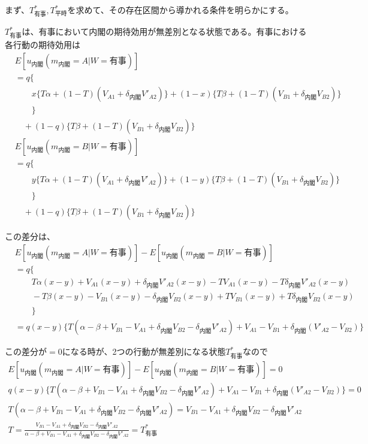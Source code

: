 \documentclass[main.tex]{subfiles}
\begin{document}
まず、$T^*_{有事}, T^*_{平時}$を求めて、その存在区間から導かれる条件を明らかにする。

$T^*_{有事}$は、有事において内閣の期待効用が無差別となる状態である。有事における各行動の期待効用は
\begin{align*}
    & E[u_{内閣}(m_{内閣}=A|W=有事)]\\
    & = q\lbrace \\
    & \quad\quad x \lbrace T\alpha + (1-T)(V_{A1} + \delta_{内閣} V'_{A2}) \rbrace + (1-x)\lbrace T\beta + (1-T)(V_{B1} + \delta_{内閣} V_{B2}) \rbrace \\
    & \quad\quad \rbrace\\
    & \quad +(1-q)\lbrace T\beta + (1-T)(V_{B1} + \delta_{内閣} V_{B2}) \rbrace
\end{align*}
\begin{align*}
    & E[u_{内閣}(m_{内閣}=B|W=有事)]\\
    & = q\lbrace \\
    & \quad\quad y \lbrace T\alpha + (1-T)(V_{A1} + \delta_{内閣} V'_{A2}) \rbrace + (1-y)\lbrace T\beta + (1-T)(V_{B1} + \delta_{内閣} V_{B2}) \rbrace \\
    & \quad\quad \rbrace\\
    & \quad +(1-q)\lbrace T\beta + (1-T)(V_{B1} + \delta_{内閣} V_{B2}) \rbrace
\end{align*}

この差分は、
\begin{align*}
    & E[u_{内閣}(m_{内閣}=A|W=有事)] - E[u_{内閣}(m_{内閣}=B|W=有事)]\\
    & = q\lbrace \\
    & \quad\quad T\alpha(x-y) + V_{A1}(x-y) + \delta_{内閣}V'_{A2}(x-y) - TV_{A1}(x-y) - T\delta_{内閣}V'_{A2}(x-y) \\
    & \quad\quad -T\beta(x-y) - V_{B1}(x-y) - \delta_{内閣}V_{B2}(x-y) + TV_{B1}(x-y) + T\delta_{内閣}V_{B2}(x-y)\\
    & \quad\quad  \rbrace\\
    & = q(x-y) \lbrace T(\alpha-\beta + V_{B1}-V_{A1} + \delta_{内閣}V_{B2} - \delta_{内閣}V'_{A2}) 
                +V_{A1} - V_{B1} + \delta_{内閣}(V'_{A2} - V_{B2}) \rbrace
\end{align*}

この差分が$=0$になる時が、2つの行動が無差別になる状態$T^*_{有事}$なので
\begin{gather*}
    E[u_{内閣}(m_{内閣}=A|W=有事)] - E[u_{内閣}(m_{内閣}=B|W=有事)] = 0　\\
    q(x-y) \lbrace T(\alpha-\beta + V_{B1}-V_{A1} + \delta_{内閣}V_{B2} - \delta_{内閣}V'_{A2}) 
                +V_{A1} - V_{B1} + \delta_{内閣}(V'_{A2} - V_{B2})  \rbrace = 0 \\
    T(\alpha-\beta + V_{B1}-V_{A1} + \delta_{内閣}V_{B2} - \delta_{内閣}V'_{A2}) 
    = V_{B1} - V_{A1} +\delta_{内閣}V_{B2} - \delta_{内閣}V'_{A2}　\\
    T = \frac{ V_{B1} - V_{A1} +\delta_{内閣}V_{B2} - \delta_{内閣}V'_{A2} }{ \alpha-\beta + V_{B1}-V_{A1} + \delta_{内閣}V_{B2} - \delta_{内閣}V'_{A2} }
        = T^*_{有事}
\end{gather*}
\end{document}
